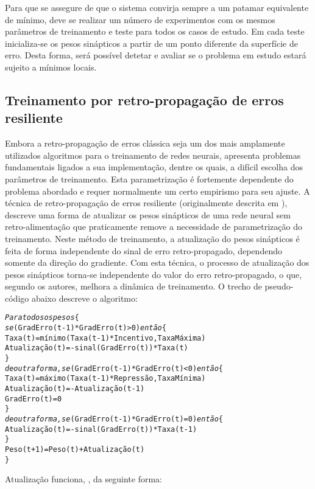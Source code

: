 Para que se assegure de que o sistema convirja sempre a um patamar equivalente
de mínimo, deve se realizar um número de experimentos com os mesmos parâmetros
de treinamento e teste para todos os casos de estudo. Em cada teste
inicializa-se os pesos sinápticos a partir de um ponto diferente da superfície
de erro. Desta forma, será possível detetar e avaliar se o problema em estudo
estará sujeito a mínimos locais.

\subsection{Treinamento por retro-propagação de erros resiliente}

Embora a retro-propagação de erros clássica seja um dos mais amplamente
utilizados algoritmos para o treinamento de redes neurais, apresenta problemas
fundamentais ligados a sua implementação, dentre os quais, a difícil escolha
dos parâmetros de treinamento. Esta parametrização é fortemente dependente do
problema abordado e requer normalmente um certo empirismo para seu ajuste. A
técnica de retro-propagação de erros resiliente (originalmente descrita em
\cite{rprop}), descreve uma forma de atualizar os pesos sinápticos de uma rede
neural sem retro-alimentação que praticamente remove a necessidade de
parametrização do treinamento. Neste método de treinamento, a atualização do
pesos sinápticos é feita de forma independente do sinal de erro
retro-propagado, dependendo somente da direção do gradiente. Com esta técnica,
o processo de atualização dos pesos sinápticos torna-se independente do valor
do erro retro-propagado, o que, segundo os autores, melhora a dinâmica de
treinamento. O trecho de pseudo-código abaixo descreve o algoritmo:

\begin{alltt}
\textit{Para todos os pesos} \{
  \textit{se} (GradErro(t-1) * GradErro(t) > 0) \textit{então} \{
    Taxa(t) = mínimo(Taxa(t-1) * Incentivo, TaxaMáxima)
    Atualização(t) = -sinal(GradErro(t)) * Taxa(t)
  \}
  \textit{de outra forma, se} (GradErro(t-1) * GradErro(t) < 0) \textit{então} \{
    Taxa(t) = máximo(Taxa(t-1) * Repressão, TaxaMínima)
    Atualização(t) = -Atualização(t-1)
    GradErro(t) = 0
  \}
  \textit{de outra forma, se} (GradErro(t-1) * GradErro(t) = 0) \textit{então} \{
    Atualização(t) = -sinal(GradErro(t)) * Taxa(t-1)
  \}
  Peso(t+1) = Peso(t) + Atualização(t)
\}
\end{alltt}

Atualização funciona, , da seguinte forma: 


